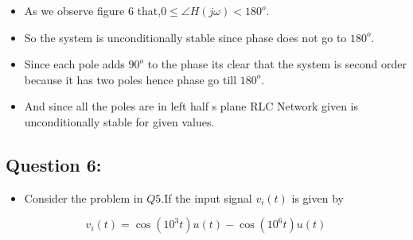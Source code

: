 \documentclass[11pt, a4paper]{article}
\begin{document}
\begin{itemize}
\item
  As we observe figure 6 that,\(0 \leq \angle H(j\omega) < 180^{o}\).
\item
  So the system is unconditionally stable since phase does not go to
  \(180^{o}\).
\item
  Since each pole adds \(90^{o}\) to the phase its clear that the system
  is second order because it has two poles hence phase go till
  \(180^{o}\).
\item
  And since all the poles are in left half s plane RLC Network given is
  unconditionally stable for given values.
\end{itemize}
\newpage

    \subsection{Question 6:}\label{question-6}

\begin{itemize}
\item
  Consider the problem in \(Q5\).If the input signal \(v_i(t)\) is given
  by
\end{itemize}

\begin{equation}
 v_i(t) = \cos (10^{3}t) u(t) − \cos (10^{6}t) u(t)
 \end{equation}
\end{document}
